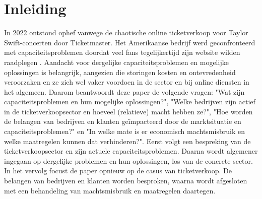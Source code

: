 
\section{Inleiding}

In 2022 ontstond ophef vanwege de chaotische online ticketverkoop voor 
Taylor Swift-concerten door Ticketmaster. Het Amerikaanse bedrijf werd
geconfronteerd met capaciteitsproblemen doordat veel fans tegelijkertijd
zijn website wilden raadplegen \cite{kelley2022senate,belga2022taylor}.
Aandacht voor dergelijke capaciteitsproblemen en mogelijke oplossingen
is belangrijk, aangezien die storingen kosten en ontevredenheid veroorzaken en
ze zich wel vaker voordoen in de sector en bij online diensten in het algemeen.
Daarom beantwoordt deze paper de volgende vragen:
"Wat zijn capaciteitsproblemen en hun mogelijke oplossingen?",
"Welke bedrijven zijn actief in de ticketverkoopsector en hoeveel (relatieve)
macht hebben ze?",
"Hoe worden de belangen van bedrijven en klanten
geïmpacteerd door de marktsituatie en capaciteitsproblemen?" en
"In welke mate is er economisch machtsmisbruik en welke maatregelen kunnen
dat verhinderen?".
Eerst volgt een bespreking van de ticketverkoopsector en
zijn actuele capaciteitsproblemen.
Daarna wordt algemener ingegaan op dergelijke problemen en hun oplossingen,
los van de concrete sector.
In het vervolg focust de paper opnieuw op de casus van ticketverkoop.
De belangen van bedrijven en klanten worden besproken,
waarna wordt afgesloten met een behandeling van machtsmisbruik en
maatregelen daartegen.